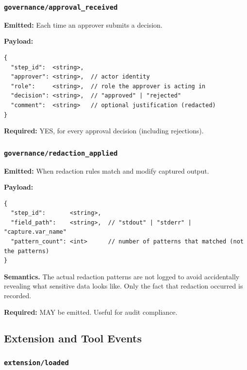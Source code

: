 \subsubsection{\texttt{governance/approval\_received}}

\textbf{Emitted:} Each time an approver submits a decision.

\textbf{Payload:}
\begin{verbatim}
{
  "step_id":  <string>,
  "approver": <string>,  // actor identity
  "role":     <string>,  // role the approver is acting in
  "decision": <string>,  // "approved" | "rejected"
  "comment":  <string>   // optional justification (redacted)
}
\end{verbatim}

\textbf{Required:} YES, for every approval decision (including rejections).


\subsubsection{\texttt{governance/redaction\_applied}}

\textbf{Emitted:} When redaction rules match and modify captured output.

\textbf{Payload:}
\begin{verbatim}
{
  "step_id":       <string>,
  "field_path":    <string>,  // "stdout" | "stderr" | "capture.var_name"
  "pattern_count": <int>      // number of patterns that matched (not the patterns)
}
\end{verbatim}

\textbf{Semantics.} The actual redaction patterns are not logged to avoid accidentally revealing what sensitive data looks like. Only the fact that redaction occurred is recorded.

\textbf{Required:} MAY be emitted. Useful for audit compliance.


\subsection{Extension and Tool Events}

\subsubsection{\texttt{extension/loaded}}

